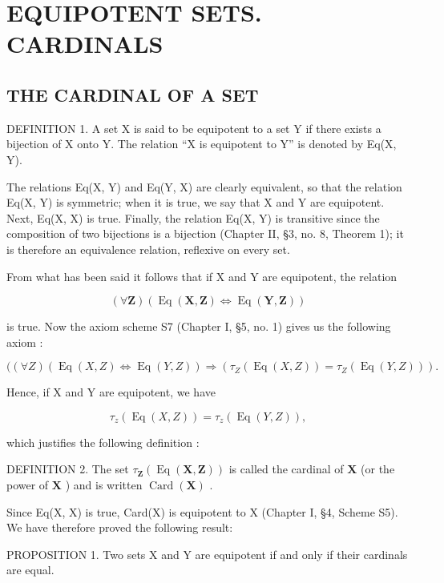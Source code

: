 \section{EQUIPOTENT SETS. CARDINALS}

\subsection{THE CARDINAL OF A SET}

DEFINITION 1. A set X is said to be equipotent to a set Y if there exists a bijection of X onto Y. The relation ``X is equipotent to Y'' is denoted by Eq(X, Y).

The relations Eq(X, Y) and Eq(Y, X) are clearly equivalent, so that the relation Eq(X, Y) is symmetric; when it is true, we say that X and Y are equipotent. Next, Eq(X, X) is true. Finally, the relation Eq(X, Y) is transitive since the composition of two bijections is a bijection (Chapter II, §3, no. 8, Theorem 1); it is therefore an equivalence relation, reflexive on every set.

From what has been said it follows that if X and Y are equipotent, the relation

\[
(\forall \mathbf {Z}) (\operatorname{Eq} (\mathbf {X}, \mathbf {Z}) \Longleftrightarrow \operatorname{Eq} (\mathbf {Y}, \mathbf {Z}))
\]

is true. Now the axiom scheme S7 (Chapter I, §5, no. 1) gives us the following axiom :

\[
((\forall Z) (\operatorname{Eq} (X, Z) \Longleftrightarrow \operatorname{Eq} (Y, Z)) \Longrightarrow (\tau_ {Z} (\operatorname{Eq} (X, Z)) = \tau_ {Z} (\operatorname{Eq} (Y, Z))).
\]

Hence, if X and Y are equipotent, we have

\[
\tau_ {z} (\operatorname{Eq} (X, Z)) = \tau_ {z} (\operatorname{Eq} (Y, Z)),
\]

which justifies the following definition :

DEFINITION 2. The set \(\tau_{\mathbf{Z}}(\operatorname{Eq}(\mathbf{X},\mathbf{Z}))\) is called the cardinal of \(\mathbf{X}\) (or the power of \(\mathbf{X}\) ) and is written \(\operatorname{Card}(\mathbf{X})\) .

Since Eq(X, X) is true, Card(X) is equipotent to X (Chapter I, §4, Scheme S5). We have therefore proved the following result:

PROPOSITION 1. Two sets X and Y are equipotent if and only if their cardinals are equal.


